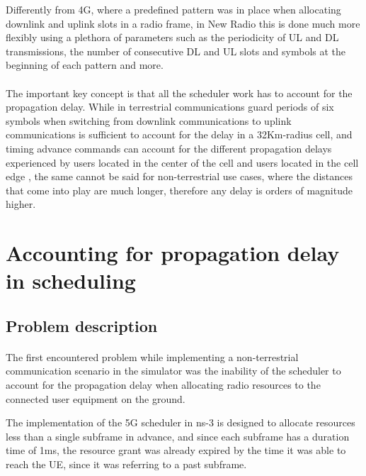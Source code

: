 Differently from 4G, where a predefined pattern was in place when allocating downlink and uplink slots in a radio frame, in New Radio this is done much more flexibly using a plethora of parameters such as the periodicity of UL and DL transmissions, the number of consecutive DL and UL slots and symbols at the beginning of each pattern and more.

\paragraph{}The important key concept is that all the scheduler work has to account for the propagation delay. While in terrestrial communications guard periods of six symbols when switching from downlink communications to uplink communications is sufficient to account for the delay in a 32Km-radius cell, and timing advance commands can account for the different propagation delays experienced by users located in the center of the cell and users located in the cell edge \cite{gsma-5g-tdd-sync}, the same cannot be said for non-terrestrial use cases, where the distances that come into play are much longer, therefore any delay is orders of magnitude higher.

\section{Accounting for propagation delay in scheduling}
\label{sec:pd-sched-acc}

\subsection{Problem description}
\label{ss:propdelay-problem-desc}
\paragraph{}
The first encountered problem while implementing a non-terrestrial communication scenario in the simulator was the inability of the scheduler to account for the propagation delay when allocating radio resources to the connected user equipment on the ground.

The implementation of the 5G scheduler in ns-3 is designed to allocate resources less than a single subframe in advance, and since each subframe has a duration time of 1ms, the resource grant was already expired by the time it was able to reach the \ac{UE}, since it was referring to a past subframe.

